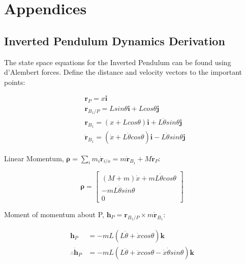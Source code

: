 \documentclass[../main.tex]{subfiles}
\begin{document}
\chapter{Appendices}
\section{Inverted Pendulum Dynamics Derivation}
\label{appendix:invpen}

The state space equations for the Inverted Pendulum can be found using d'Alembert forces. Define the distance and velocity vectors to the important points:

\begin{align*}
    & \boldsymbol{r}_P = x \boldsymbol{i} \\
    & \boldsymbol{r}_{B_1/P} = L sin \theta \boldsymbol{i} + L cos \theta \boldsymbol{j} \\
    & \boldsymbol{r}_{B_1} = (x+L cos \theta)\boldsymbol{i}+L \dot{\theta} sin \theta  \boldsymbol{j} \\
    & \dot{\boldsymbol{r}}_{B_1} = (\dot{x} + L\dot{\theta}cos\theta)\boldsymbol{i} - L\dot{\theta}sin\theta \boldsymbol{j}
\end{align*}

Linear Momentum, $\boldsymbol{\rho} = \sum_i m_i \dot{\boldsymbol{r}}_{i/o} = m \dot{\boldsymbol{r}}_{B_1} + M \dot{\boldsymbol{r}}_{P}$:

\begin{equation*}
\boldsymbol{\rho} = 
\begin{bmatrix} (M+m)\dot{x} + m L\dot{\theta}cos{\theta} \\ -m L\dot{\theta}sin{\theta} \\ 0 \end{bmatrix} 
\end{equation*}

Moment of momentum about P, $\boldsymbol{h}_P = \boldsymbol{r}_{B_1/P} \times m \boldsymbol{\dot{r}}_{B_1}$:

\begin{align*}
\boldsymbol{h}_P & = -m L(L\dot{\theta} + \dot{x}cos\theta) \boldsymbol{k} \\
\therefore \boldsymbol{\dot{h}}_P & = -mL(L\ddot{\theta} + \ddot{x}cos\theta - \dot{x}\dot{\theta}sin\theta) \boldsymbol{k}
\end{align*}
\end{document}
